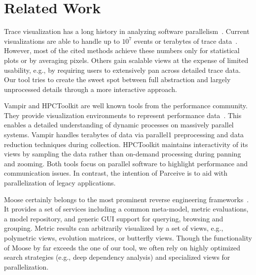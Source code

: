 \section{Related Work}
\label{sec:related_work}
Trace visualization has a long history in analyzing software
parallelism~\cite{TraceVisualization}. Current visualizations are able to
handle up to $10^7$ events or terabytes of trace data~\cite{State}. However,
most of the cited methods achieve these numbers only for statistical plots or
by averaging pixels. Others gain scalable views at the expense of limited
usability, e.g., by requiring users to extensively pan across detailed trace
data. Our tool tries to create the sweet spot between full abstraction and
largely unprocessed details through a more interactive approach.

Vampir and HPCToolkit are well known tools from the performance community. They
provide visualization environments to represent performance data~\cite{Vampir,
HPCToolkit}. This enables a detailed understanding of dynamic processes on
massively parallel systems. Vampir handles terabytes of data via parallel1
preprocessing and data reduction techniques during collection. HPCToolkit
maintains interactivity of its views by sampling the data rather than on-demand
processing during panning and zooming. Both tools focus on parallel software to
highlight performance and communication issues. In contrast, the intention of
Parceive is to aid with parallelization of legacy applications.

Moose certainly belongs to the most prominent reverse engineering
frameworks~\cite{Moose}. It provides a set of services including a common
meta-model, metric evaluations, a model repository, and generic GUI support for
querying, browsing and grouping. Metric results can arbitrarily visualized by a
set of views, e.g., polymetric views, evolution matrices, or butterfly views.
Though the functionality of Moose by far exceeds the one of our tool, we often
rely on highly optimized search strategies (e.g., deep dependency analysis) and
specialized views for parallelization.
